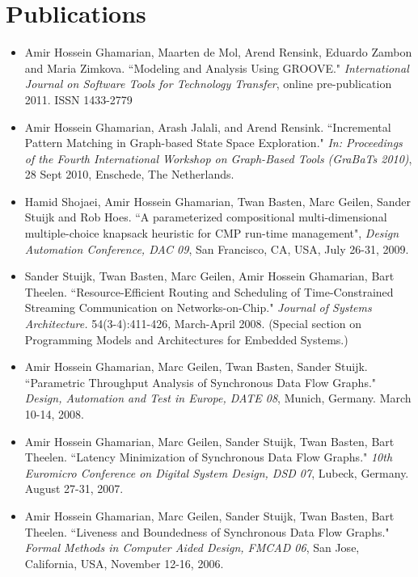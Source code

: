 \documentclass[a4paper]{article}
\begin{document}
\section{Publications}
\begin{itemize}
\item Amir Hossein Ghamarian, Maarten de Mol, Arend Rensink, Eduardo
Zambon and Maria Zimkova. ``Modeling and Analysis Using GROOVE." \emph{
International Journal on Software Tools for Technology Transfer},
online pre-publication 2011. ISSN 1433-2779

\item Amir Hossein Ghamarian, Arash Jalali, and Arend Rensink. ``Incremental
Pattern Matching in Graph-based State Space Exploration." \emph{In: Proceedings of the Fourth
International Workshop on Graph-Based Tools (GraBaTs 2010)}, 28 Sept 2010, Enschede, The Netherlands.

\item Hamid Shojaei, Amir Hossein Ghamarian, Twan Basten, Marc Geilen, Sander Stuijk and Rob Hoes.
``A parameterized compositional multi-dimensional multiple-choice knapsack heuristic for CMP run-time management",
\emph{Design Automation Conference, DAC 09}, San Francisco, CA, USA, July 26-31, 2009.

\item Sander Stuijk, Twan
Basten, Marc Geilen, Amir Hossein Ghamarian, Bart Theelen.
``Resource-Efficient Routing and Scheduling of Time-Constrained
Streaming Communication on Networks-on-Chip." \emph{Journal of
Systems Architecture.} 54(3-4):411-426, March-April 2008. (Special
section on Programming Models and Architectures for Embedded
Systems.)

\item Amir Hossein Ghamarian, Marc Geilen, Twan
Basten, Sander Stuijk. ``Parametric Throughput Analysis of
Synchronous Data Flow Graphs." \emph{Design, Automation and Test in
Europe, DATE 08}, Munich, Germany. March 10-14, 2008.

\item Amir Hossein Ghamarian, Marc Geilen, Sander Stuijk, Twan
Basten, Bart Theelen. ``Latency Minimization of Synchronous Data
Flow Graphs." \emph{10th Euromicro Conference on
Digital System Design, DSD 07}, Lubeck, Germany. August 27-31, 2007.

\item Amir Hossein Ghamarian, Marc Geilen, Sander Stuijk, Twan
Basten, Bart Theelen. ``Liveness and Boundedness of Synchronous Data
Flow Graphs." \emph{Formal Methods in Computer Aided Design, FMCAD
06}, San Jose, California, USA, November 12-16, 2006.


\end{itemize}
\end{document}
